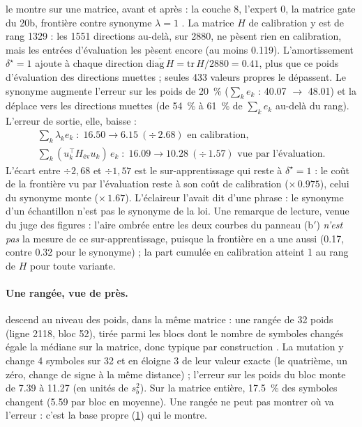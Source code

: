  le montre sur une matrice, avant et après : la couche 8, l'expert 0, la matrice gate du 20b, frontière contre synonyme $\lambda = 1$ \mes. La matrice $H$ de calibration y est de rang \num{1329} : les \num{1551} directions au-delà, sur \num{2880}, ne pèsent rien en calibration, mais les entrées d'évaluation les pèsent encore (au moins \num{0.119}). L'amortissement $\delta^\star = 1$ ajoute à chaque direction $\overline{\mathrm{diag}\,H} = \mathrm{tr}\,H/\num{2880} = \num{0.41}$, plus que ce poids d'évaluation des directions muettes ; seules \num{433} valeurs propres le dépassent. Le synonyme augmente l'erreur sur les poids de \SI{20}{\percent} ($\sum_k e_k$ : \num{40.07} $\to$ \num{48.01}) et la déplace vers les directions muettes (de \SI{54}{\percent} à \SI{61}{\percent} de $\sum_k e_k$ au-delà du rang). L'erreur de sortie, elle, baisse :
\begin{gather*}
\textstyle\sum_k \lambda_k e_k \;:\; \num{16.50} \to \num{6.15}\ (\div\,\num{2.68}) \text{ en calibration,}\\
\textstyle\sum_k (u_k^\top H_{\text{év}} u_k)\, e_k \;:\; \num{16.09} \to \num{10.28}\ (\div\,\num{1.57}) \text{ vue par l'évaluation.}
\end{gather*}
L'écart entre $\div 2{,}68$ et $\div 1{,}57$ est le sur-apprentissage qui reste à $\delta^\star = 1$ : le coût de la frontière vu par l'évaluation reste à son coût de calibration ($\times\,\num{0.975}$), celui du synonyme monte ($\times\,\num{1.67}$). L'éclaireur l'avait dit d'une phrase : le synonyme d'un échantillon n'est pas le synonyme de la loi. Une remarque de lecture, venue du juge des figures : l'aire ombrée entre les deux courbes du panneau (b$'$) \emph{n'est pas} la mesure de ce sur-apprentissage, puisque la frontière en a une aussi (\num{0.17}, contre \num{0.32} pour le synonyme) ; la part cumulée en calibration atteint 1 au rang de $H$ pour toute variante.

\begin{figure}[tbp]
\centering
\GrapheSynoBasePropre
{}
\label{fig:t3-syno-base-propre}
\end{figure}

\paragraph{Une rangée, vue de près.}  descend au niveau des poids, dans la même matrice : une rangée de 32 poids (ligne \num{2118}, bloc 52), tirée parmi les blocs dont le nombre de symboles changés égale la médiane sur la matrice, donc typique par construction \mes. La mutation y change 4 symboles sur 32 et en éloigne 3 de leur valeur exacte (le quatrième, un zéro, change de signe à la même distance) ; l'erreur sur les poids du bloc monte de \num{7.39} à \num{11.27} (en unités de $s_b^2$). Sur la matrice entière, \SI{17.5}{\percent} des symboles changent (\num{5.59} par bloc en moyenne). Une rangée ne peut pas montrer où va l'erreur : c'est la base propre (\cref{fig:t3-syno-base-propre}) qui le montre.

